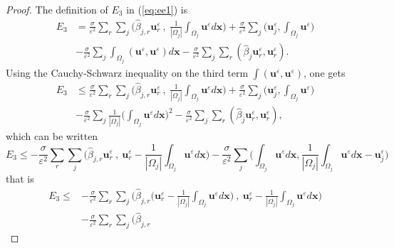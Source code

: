 \documentclass[a4paper,french,english,10pt]{article}
\newcommand\uu{\mathbf{u}}
\newcommand\eps{\varepsilon}
\newcommand\x{\mathbf{x}}
\newcommand\uj{\uu_j}
\begin{document}
\begin{proof}
The definition of $E_3$ in (\ref{eq:ee1}) is
\begin{equation*}
\begin{aligned}
E_3 &= \frac{\sigma}{\eps^2} \sum_r \sum_j  \bigg(
\widehat{\beta}_{j,r}\textbf{u}_r^{\eps}  \: , \:
\frac{1}{|\Omega_j|}\int_{\Omega_j} \textbf{u}^{\eps} d\x \bigg)
+\frac{\sigma}{\eps^2}\sum_j\bigg(  \textbf{u}_j^{\eps} ,
\int_{\Omega_j}\textbf{u}^{\eps} \bigg) \\
&-\frac{\sigma}{\eps^2}\sum_j\int_{\Omega_j}(\textbf{u}^{\eps},\textbf{u}^{\eps}
)d\x -\frac{\sigma}{\eps^2}\sum_{j}\sum_{r}
(\widehat{\beta}_{j}
\textbf{u}_r^{\eps},\textbf{u}_r^{\eps}).
\end{aligned}
\end{equation*}
Using the Cauchy-Schwarz inequality on the third term
 $\int (\textbf{u}^{\eps},\textbf{u}^{\eps})$, one gets
\begin{equation*}
\begin{aligned}
E_3 &\leq \frac{\sigma}{\eps^2} \sum_r \sum_j  \bigg(
\widehat{\beta}_{j,r}\textbf{u}_r^{\eps}  \: , \:
\frac{1}{|\Omega_j|}\int_{\Omega_j} \uu^{\eps}d\x \bigg) +\frac{\sigma}{\eps^2}\sum_j\bigg(  \textbf{u}_j^{\eps} ,
\int_{\Omega_j}\textbf{u}^{\eps} \bigg) \\
&- \frac{\sigma}{\eps^2}\sum_j \frac{1}{|\Omega_j|}\bigg(
\int_{\Omega_j}\textbf{u}^{\eps}d\x \bigg)^2 -\frac{\sigma}{\eps^2}\sum_{j}
\sum_{r}
(\widehat{\beta}_{j}    
\textbf{u}_r^{\eps},\textbf{u}_r^{\eps}),
\end{aligned}
\end{equation*}
which can be written
\begin{equation*}
E_3 \leq -\frac{\sigma}{\eps^2} \sum_r \sum_j  \bigg(
\widehat{\beta}_{j,r}\textbf{u}_r^{\eps}  \: , \:
\textbf{u}_r^{\eps}-\frac{1}{|\Omega_j|}\int_{\Omega_j} \textbf{u}^{\eps} d\x
\bigg) - \frac{\sigma}{\eps^2}\sum_j\bigg( \int_{\Omega_j}\textbf{u}^{\eps}d\x ,
 \frac{1}{|\Omega_j|}  \int_{\Omega_j}\textbf{u}^{\eps}d\x -\uj^{\eps}
\bigg) 
\end{equation*}
that is 
\begin{equation*}
\begin{aligned}
E_3 \leq &-\frac{\sigma}{\eps^2} \sum_r \sum_j  \bigg( \widehat{\beta}_{j,r}\bigg(
\textbf{u}_r^{\eps}- \frac{1}{|\Omega_j|}\int_{\Omega_j} \textbf{u}^{\eps} d\x\bigg) 
\: , \: \textbf{u}_r^{\eps}-\frac{1}{|\Omega_j|}\int_{\Omega_j}
\textbf{u}^{\eps} d\x \bigg) \\
&-\frac{\sigma}{\eps^2} \sum_r \sum_j  \bigg( \widehat{\beta}_{j,r}

\end{aligned}
\end{equation*}
\end{proof}
\end{document}
